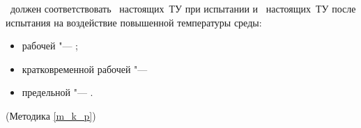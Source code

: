 \dut \ должен соответствовать \treb \ настоящих~ТУ при испытании и \trebafter \ настоящих~ТУ после испытания на воздействие повышенной температуры среды:
%
\begin{itemize}
	\item рабочей "--- \kp;
	\item кратковременной рабочей "--- \kpshort\
	\item предельной "--- \kpmax.
\end{itemize}

\begin{flushright}
	(Методика \ref{m_k_p})
\end{flushright}

